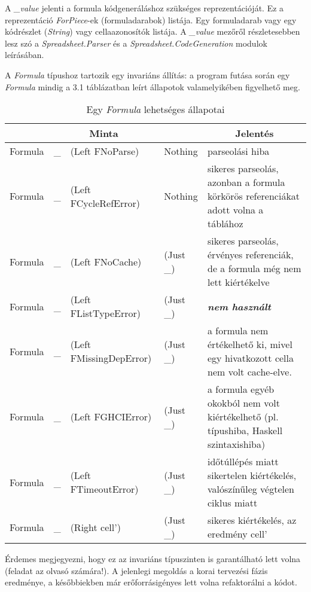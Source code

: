 A \textit{\_value} jelenti a formula kódgeneráláshoz szükséges reprezentációját.  Ez a reprezentáció \textit{ForPiece}-ek (formuladarabok) listája. Egy formuladarab vagy egy kódrészlet (\textit{String}) vagy cellaazonosítók listája. A \textit{\_value} mezőről részletesebben lesz szó a \textit{Spreadsheet.Parser} és a \textit{Spreadsheet.CodeGeneration} modulok leírásában. 

A \textit{Formula} típushoz tartozik egy invariáns állítás: a program futása során egy \textit{Formula} mindig a 3.1 táblázatban leírt állapotok valamelyikében figyelhető meg.

\begin{table}
	\centering
	\begin{tabularx}{\textwidth}{ |l l l l| X |}
		\hline
		\multicolumn{4}{|c|}{Minta} & \multicolumn{1}{|c|}{Jelentés} \\
		\hline\hline
		Formula & \_ & (Left FNoParse) & Nothing & parseolási hiba \\
		\hline
		Formula & \_ & (Left FCycleRefError) & Nothing & sikeres parseolás, azonban a formula körkörös referenciákat adott volna a táblához \\
		\hline
		Formula & \_ & (Left FNoCache) & (Just \_) & sikeres parseolás, érvényes referenciák, de a formula még nem lett kiértékelve \\
		\hline
		Formula & \_ & (Left FListTypeError) & (Just \_) & \textbf{\textit{nem használt}} \\
		\hline
		Formula & \_ & (Left FMissingDepError) & (Just \_) & a formula nem értékelhető ki, mivel egy hivatkozott cella nem volt cache-elve. \\
		\hline
		Formula & \_ & (Left FGHCIError) & (Just \_) & a formula egyéb okokból nem volt kiértékelhető (pl. típushiba, Haskell szintaxishiba) \\
		\hline
		Formula & \_ & (Left FTimeoutError) & (Just \_) & időtúllépés miatt sikertelen kiértékelés, valószínűleg végtelen ciklus miatt \\
		\hline
		Formula & \_ & (Right cell') & (Just \_) & sikeres kiértékelés, az eredmény cell' \\
		\hline 
	\end{tabularx}
	\caption[Egy \textit{Formula} lehetséges állapotai]{Egy \textit{Formula} lehetséges állapotai}
	\label{tab:formula}
\end{table}

Érdemes megjegyezni, hogy ez az invariáns típuszinten is garantálható lett volna (feladat az olvasó számára!). A jelenlegi megoldás a korai tervezési fázis eredménye, a későbbiekben már erőforrásigényes lett volna refaktorálni a kódot.   

